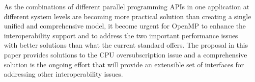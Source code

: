 


As the combinations of different parallel programming APIs in one application
at different system levels are becoming more
practical solution than creating a single unified and 
comprehensive model, it become urgent for OpenMP to enhance the 
interoperability support and to address the two important performance issues with better solutions 
than what the current standard offers. The proposal in this paper provides 
solutions to the CPU oversubscription issue and a comprehensive solution is the ongoing effort 
that will provide an extensible set of interfaces for addressing other interoperability issues. 








